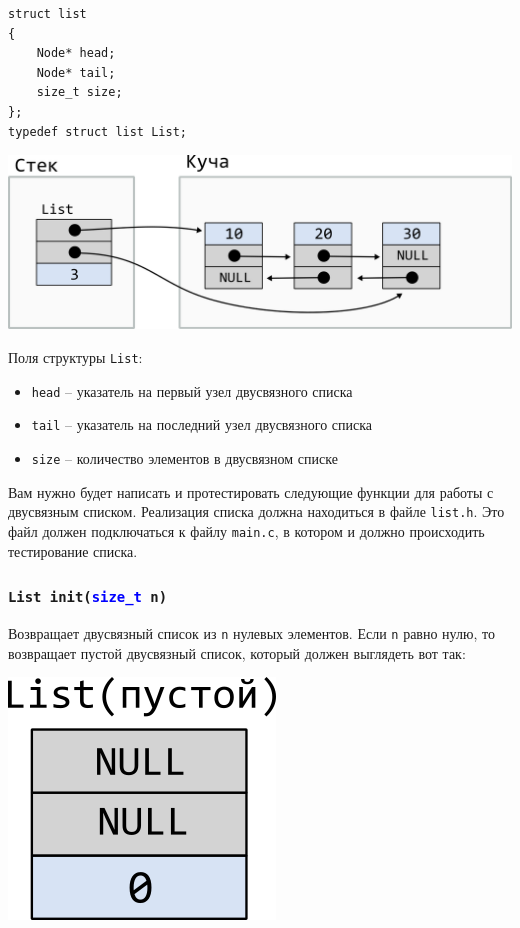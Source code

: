 \documentclass[10pt]{article}
\begin{document}
\noindent\begin{minipage}{.35\textwidth}
\begin{lstlisting}
struct list 
{
    Node* head;
    Node* tail;
    size_t size;
};
typedef struct list List;
\end{lstlisting}
\end{minipage}
\begin{minipage}{.55\textwidth}
\includegraphics[scale=0.8]{../images/list.png}
\end{minipage}

Поля структуры \texttt{List}:
\begin{itemize}
\item \texttt{head} -- указатель на первый узел двусвязного списка
\item \texttt{tail} -- указатель на последний узел двусвязного списка
\item \texttt{size} -- количество элементов в двусвязном списке
\end{itemize}
Вам нужно будет написать и протестировать следующие функции для работы с двусвязным списком.
Реализация списка должна находиться в файле \texttt{list.h}. Это файл должен подключаться к файлу \texttt{main.c}, в котором и должно происходить тестирование списка.

\subsubsection{\texttt{List init(\textcolor{blue}{size\_t} n)}}
Возвращает двусвязный список из \texttt{n} нулевых элементов. Если \texttt{n} равно нулю, то возвращает пустой двусвязный список, который должен выглядеть вот так:
\begin{center}
\includegraphics[scale=1]{../images/list_empty.png}
\end{center}
\end{document}

